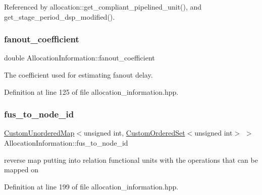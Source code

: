 Referenced by allocation\+::get\+\_\+compliant\+\_\+pipelined\+\_\+unit(), and get\+\_\+stage\+\_\+period\+\_\+dsp\+\_\+modified().

\mbox{\label{classAllocationInformation_ae286ec58583e2e5bdc93f918b604594f}} 
\subsubsection{\texorpdfstring{fanout\+\_\+coefficient}{fanout\_coefficient}}
{\footnotesize\ttfamily double Allocation\+Information\+::fanout\+\_\+coefficient\hspace{0.3cm}{\ttfamily [private]}}



The coefficient used for estimating fanout delay. 



Definition at line 125 of file allocation\+\_\+information.\+hpp.

\mbox{\label{classAllocationInformation_a5dbaa902da34e4caa37df673e7896da7}} 
\subsubsection{\texorpdfstring{fus\+\_\+to\+\_\+node\+\_\+id}{fus\_to\_node\_id}}
{\footnotesize\ttfamily \hyperlink{custom__map_8hpp_ad1ed68f2ff093683ab1a33522b144adc}{Custom\+Unordered\+Map}$<$unsigned int, \hyperlink{classCustomOrderedSet}{Custom\+Ordered\+Set}$<$unsigned int$>$ $>$ Allocation\+Information\+::fus\+\_\+to\+\_\+node\+\_\+id\hspace{0.3cm}{\ttfamily [private]}}



reverse map putting into relation functional units with the operations that can be mapped on 



Definition at line 199 of file allocation\+\_\+information.\+hpp.



